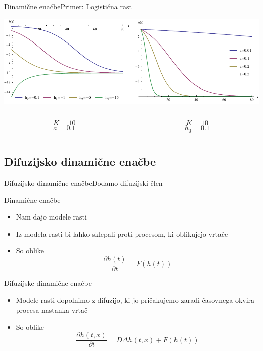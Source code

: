 \documentclass{beamer}
\begin{document}
\begin{frame}{Dinamične enačbe}{Primer: Logistična rast}
\begin{center}
  \hspace*{-0.09\textwidth}\includegraphics[width=1.2\textwidth]{slike/logisticna-rast}
  \footnotesize
\begin{columns}
  \begin{column}{0.5\textwidth}
  \[ K = 10 \]
  \[ a = 0.1 \]
  \end{column}
  \begin{column}{0.5\textwidth}
  \[ K = 10 \]
  \[ h_0 = 0.1 \]
  \end{column}
\end{columns}
\end{center}
\end{frame}


\subsection{Difuzijsko dinamične enačbe}

\begin{frame}{Difuzijsko dinamične enačbe}{Dodamo difuzijski člen}

\begin{block}{Dinamične enačbe}
  \begin{itemize}
  \item
    Nam dajo modele rasti
  \item
    Iz modela rasti bi lahko sklepali proti procesom, ki oblikujejo vrtače
  \item
    So oblike \begin{equation} \frac{\partial h(t)}{\partial t} = F( h(t) ) \end{equation}
  \end{itemize}
\end{block}
\begin{block}{Difuzijske dinamične enačbe}
  \begin{itemize}
  \item
    Modele rasti dopolnimo z difuzijo, ki jo pričakujemo zaradi časovnega okvira procesa nastanka vrtač
  \item
    So oblike \begin{equation}  \frac{ \partial h(t,x) }{ \partial t} = D \Delta h(t,x) + F( h(t) ) \end{equation}
  \end{itemize}
\end{block}
\end{frame}
\end{document}
